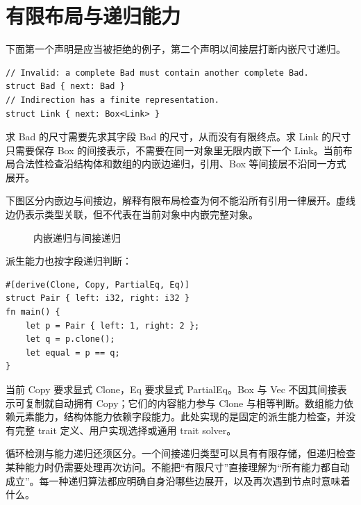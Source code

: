 \section{有限布局与递归能力}
下面第一个声明是应当被拒绝的例子，第二个声明以间接层打断内嵌尺寸递归。
\begin{lstlisting}[language=Rustless]
// Invalid: a complete Bad must contain another complete Bad.
struct Bad { next: Bad }
// Indirection has a finite representation.
struct Link { next: Box<Link> }
\end{lstlisting}
求 Bad 的尺寸需要先求其字段 Bad 的尺寸，从而没有有限终点。求 Link 的尺寸只需要保存 Box 的间接表示，不需要在同一对象里无限内嵌下一个 Link。当前布局合法性检查沿结构体和数组的内嵌边递归，引用、Box 等间接层不沿同一方式展开。

下图区分内嵌边与间接边，解释有限布局检查为何不能沿所有引用一律展开。虚线边仍表示类型关联，但不代表在当前对象中内嵌完整对象。
\begin{figure}[htbp]
\centering
{}
\caption{内嵌递归与间接递归}
\end{figure}

派生能力也按字段递归判断：
\begin{lstlisting}[language=Rustless]
#[derive(Clone, Copy, PartialEq, Eq)]
struct Pair { left: i32, right: i32 }
fn main() {
    let p = Pair { left: 1, right: 2 };
    let q = p.clone();
    let equal = p == q;
}
\end{lstlisting}
当前 Copy 要求显式 Clone，Eq 要求显式 PartialEq。Box 与 Vec 不因其间接表示可复制就自动拥有 Copy；它们的内容能力参与 Clone 与相等判断。数组能力依赖元素能力，结构体能力依赖字段能力。此处实现的是固定的派生能力检查，并没有完整 trait 定义、用户实现选择或通用 trait solver。

循环检测与能力递归还须区分。一个间接递归类型可以具有有限存储，但递归检查某种能力时仍需要处理再次访问。不能把“有限尺寸”直接理解为“所有能力都自动成立”。每一种递归算法都应明确自身沿哪些边展开，以及再次遇到节点时意味着什么。

